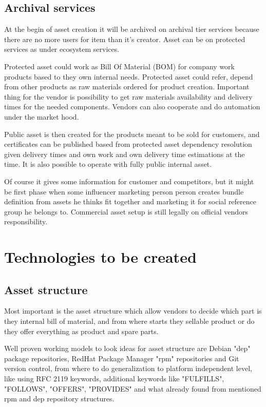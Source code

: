 \subsection{Archival services}
\label{archival_services}
At the begin of asset creation it will be archived on archival tier services because there are no more users for item than it's creator. Asset can be on protected services as under ecosystem services.

Protected asset could work as Bill Of Material (BOM) for company work products based to they own internal needs. Protected asset could refer, depend from other products as raw materials ordered for product creation. Important thing for the vendor is possibility to get raw materials availability and delivery times for the needed components. Vendors can also cooperate and  do automation under the market hood.

Public asset is then created for the products meant to be sold for customers, and certificates can be published based from protected asset dependency resolution given delivery times and own work and own delivery time estimations at the time. It is also possible to operate with fully public internal asset.

Of course it gives some information for customer and competitors, but it might be first phase when some influencer marketing person person creates bundle definition from assets he thinks fit together and marketing it for social reference group he belongs to. Commercial asset setup is still legally on official vendors responsibility.



\section{Technologies to be created}
\label{technologies}

\subsection{Asset structure}
\label{asset_structure}
Most important is the asset structure which allow vendors to decide which part is they internal bill of material, and from where starts they sellable product or do they offer everything as product and spare parts.

Well proven working models to look ideas for asset structure are Debian "dep" package repositories, RedHat Package Manager "rpm" repositories and Git version control, from where to do generalization to platform independent level, like using RFC 2119\cite{rfc2119} keywords, additional keywords like "FULFILLS", "FOLLOWS", "OFFERS", "PROVIDES" and what already found from mentioned rpm and dep repository structures.

